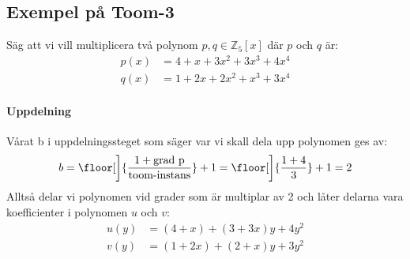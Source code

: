 \subsection{Exempel på Toom-3}
Säg att vi vill multiplicera två polynom $p, q \in \mathbb{Z}_5[x]$ där $p$ och
$q$ är:
\begin{align*}
  p(x) &= 4+x+3x^2+3x^3+4x^4 \\
  q(x) &= 1+2x+2x^2+x^3+3x^4
\end{align*}

\paragraph{Uppdelning}
Vårat b i uppdelningssteget som säger var vi skall dela upp polynomen ges av:
\begin{equation*}
  b = \floor[\bigg]{\frac{1 + \mbox{grad p}}{\mbox{toom-instans}}} + 1 = \floor[\bigg]{\frac{1 + 4}{3}} + 1 = 2
\end{equation*}
Alltså delar vi polynomen vid grader som är multiplar av 2 och låter delarna
vara koefficienter i polynomen $u$ och $v$:
\begin{align*}
  u(y) &= (4+x)+(3 + 3x)y+ 4y^2 \\
  v(y) &= (1 + 2x)+ (2 + x)y + 3y^2
\end{align*}

